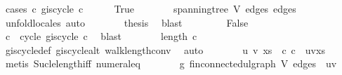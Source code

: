 \begin{isabellebody}
\ {\isacharparenleft}{\kern0pt}cases\ {\isachardoublequoteopen}{\isasymforall}c{\isachardot}{\kern0pt}\ {\isasymnot}g{\isachardot}{\kern0pt}is{\isacharunderscore}{\kern0pt}cycle{}\ c{\isachardoublequoteclose}{\isacharparenright}{\kern0pt}\isanewline
\ \ \ \ \isamarkupfalse%
\ True\isanewline
\ \ \ \ \isamarkupfalse%
\ \isamarkupfalse%
\ {\isachardoublequoteopen}spanning{\isacharunderscore}{\kern0pt}tree\ V\ edges\ edges{\isachardoublequoteclose}\ \isamarkupfalse%
\ {\isacharparenleft}{\kern0pt}unfold{\isacharunderscore}{\kern0pt}locales{\isacharcomma}{\kern0pt}\ auto{\isacharparenright}{\kern0pt}\isanewline
\ \ \ \ \isamarkupfalse%
\ \isamarkupfalse%
\ {\isacharquery}{\kern0pt}thesis\ \isamarkupfalse%
\ blast\isanewline
\ \ \isamarkupfalse%
\isanewline
\ \ \ \ \isamarkupfalse%
\ False\isanewline
\ \ \ \ \isamarkupfalse%
\ \isamarkupfalse%
\ c\ \ cycle{\isacharcolon}{\kern0pt}\ {\isachardoublequoteopen}g{\isachardot}{\kern0pt}is{\isacharunderscore}{\kern0pt}cycle{}\ c{\isachardoublequoteclose}\ \isamarkupfalse%
\ blast\isanewline
\ \ \ \ \isamarkupfalse%
\ \isamarkupfalse%
\ {\isachardoublequoteopen}length\ c\ {\isasymge}\ {}{\isachardoublequoteclose}\ \isamarkupfalse%
\ g{\isachardot}{\kern0pt}is{\isacharunderscore}{\kern0pt}cycle{}{\isacharunderscore}{\kern0pt}def\ g{\isachardot}{\kern0pt}is{\isacharunderscore}{\kern0pt}cycle{\isacharunderscore}{\kern0pt}alt\ walk{\isacharunderscore}{\kern0pt}length{\isacharunderscore}{\kern0pt}conv\ \isamarkupfalse%
\ auto\isanewline
\ \ \ \ \isamarkupfalse%
\ \isamarkupfalse%
\ u\ v\ xs\ \ c{\isacharcolon}{\kern0pt}\ {\isachardoublequoteopen}c\ {\isacharequal}{\kern0pt}\ u{\isacharhash}{\kern0pt}v{\isacharhash}{\kern0pt}xs{\isachardoublequoteclose}\ \isamarkupfalse%
\ {\isacharparenleft}{\kern0pt}metis\ Suc{\isacharunderscore}{\kern0pt}le{\isacharunderscore}{\kern0pt}length{\isacharunderscore}{\kern0pt}iff\ numeral{\isacharunderscore}{\kern0pt}{}{\isacharunderscore}{\kern0pt}eq{\isacharunderscore}{\kern0pt}{}{\isacharparenright}{\kern0pt}\isanewline
\ \ \ \ \isamarkupfalse%
\ \isamarkupfalse%
\ g{\isacharprime}{\kern0pt}{\isacharcolon}{\kern0pt}\ {\isachardoublequoteopen}fin{\isacharunderscore}{\kern0pt}connected{\isacharunderscore}{\kern0pt}ulgraph\ V\ {\isacharparenleft}{\kern0pt}edges\ {\isacharminus}{\kern0pt}\ {\isacharbraceleft}{\kern0pt}{\isacharbraceleft}{\kern0pt}u{\isacharcomma}{\kern0pt}v{\isacharbraceright}{\kern0pt}{\isacharbraceright}{\kern0pt}{\isacharparenright}{\kern0pt}{\isachardoublequoteclose}\ \isamarkupfalse%

\end{isabellebody}

